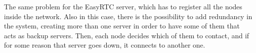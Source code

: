 The same problem for the EasyRTC server, which has to register all the nodes inside the network. Also in this case, there is the possibility to add redundancy in the system, creating more than one server in order to have some of them that acts as backup servers. Then, each node decides which of them to contact, and if for some reason that server goes down, it connects to another one. 
